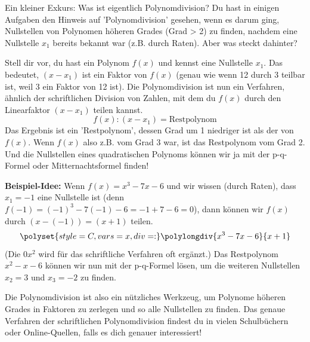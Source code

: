 \begin{infoboxumgebung}{Ein kleiner Exkurs: Was ist eigentlich Polynomdivision?}
Du hast in einigen Aufgaben den Hinweis auf 'Polynomdivision' gesehen, wenn es darum ging, Nullstellen von Polynomen höheren Grades (Grad > 2) zu finden, nachdem eine Nullstelle $x_1$ bereits bekannt war (z.B. durch Raten). Aber was steckt dahinter?

Stell dir vor, du hast ein Polynom $f(x)$ und kennst eine Nullstelle $x_1$. Das bedeutet, $(x-x_1)$ ist ein Faktor von $f(x)$ (genau wie wenn 12 durch 3 teilbar ist, weil 3 ein Faktor von 12 ist). Die Polynomdivision ist nun ein Verfahren, ähnlich der schriftlichen Division von Zahlen, mit dem du $f(x)$ durch den Linearfaktor $(x-x_1)$ teilen kannst.
\[ f(x) : (x-x_1) = \text{Restpolynom} \]
Das Ergebnis ist ein 'Restpolynom', dessen Grad um 1 niedriger ist als der von $f(x)$. Wenn $f(x)$ also z.B. vom Grad 3 war, ist das Restpolynom vom Grad 2. Und die Nullstellen eines quadratischen Polynoms können wir ja mit der p-q-Formel oder Mitternachtsformel finden!

\textbf{Beispiel-Idee:}
Wenn $f(x) = x^3 - 7x - 6$ und wir wissen (durch Raten), dass $x_1 = -1$ eine Nullstelle ist (denn $f(-1) = (-1)^3 - 7(-1) - 6 = -1 + 7 - 6 = 0$), dann können wir $f(x)$ durch $(x - (-1)) = (x+1)$ teilen.
\[
\polyset{style=C, vars=x, div=:} %
\polylongdiv{x^3 - 7x - 6}{x+1}
\]
(Die $0x^2$ wird für das schriftliche Verfahren oft ergänzt.)
Das Restpolynom $x^2 - x - 6$ können wir nun mit der p-q-Formel lösen, um die weiteren Nullstellen $x_2=3$ und $x_3=-2$ zu finden.

Die Polynomdivision ist also ein nützliches Werkzeug, um Polynome höheren Grades in Faktoren zu zerlegen und so alle Nullstellen zu finden. Das genaue Verfahren der schriftlichen Polynomdivision findest du in vielen Schulbüchern oder Online-Quellen, falls es dich genauer interessiert!
\end{infoboxumgebung}

